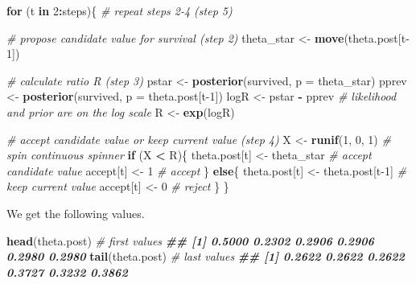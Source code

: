 \documentclass[
  12pt,
]{krantz}
\newenvironment{Shaded}{\begin{snugshade}}{\end{snugshade}}
\newcommand{\AttributeTok}[1]{\textcolor[rgb]{0.13,0.29,0.53}{#1}}
\newcommand{\CommentTok}[1]{\textcolor[rgb]{0.56,0.35,0.01}{\textit{#1}}}
\newcommand{\ControlFlowTok}[1]{\textcolor[rgb]{0.13,0.29,0.53}{\textbf{#1}}}
\newcommand{\DecValTok}[1]{\textcolor[rgb]{0.00,0.00,0.81}{#1}}
\newcommand{\DocumentationTok}[1]{\textcolor[rgb]{0.56,0.35,0.01}{\textbf{\textit{#1}}}}
\newcommand{\FunctionTok}[1]{\textcolor[rgb]{0.13,0.29,0.53}{\textbf{#1}}}
\newcommand{\NormalTok}[1]{#1}
\newcommand{\OtherTok}[1]{\textcolor[rgb]{0.56,0.35,0.01}{#1}}
\newcommand{\SpecialCharTok}[1]{\textcolor[rgb]{0.81,0.36,0.00}{\textbf{#1}}}
\begin{document}
\begin{Shaded}
\begin{Highlighting}[]
\ControlFlowTok{for}\NormalTok{ (t }\ControlFlowTok{in} \DecValTok{2}\SpecialCharTok{:}\NormalTok{steps)\{ }\CommentTok{\# repeat steps 2{-}4 (step 5)}
  
  \CommentTok{\# propose candidate value for survival (step 2)}
\NormalTok{  theta\_star }\OtherTok{\textless{}{-}} \FunctionTok{move}\NormalTok{(theta.post[t}\DecValTok{{-}1}\NormalTok{])}
  
  \CommentTok{\# calculate ratio R (step 3)}
\NormalTok{  pstar }\OtherTok{\textless{}{-}} \FunctionTok{posterior}\NormalTok{(survived, }\AttributeTok{p =}\NormalTok{ theta\_star)  }
\NormalTok{  pprev }\OtherTok{\textless{}{-}} \FunctionTok{posterior}\NormalTok{(survived, }\AttributeTok{p =}\NormalTok{ theta.post[t}\DecValTok{{-}1}\NormalTok{])}
\NormalTok{  logR }\OtherTok{\textless{}{-}}\NormalTok{ pstar }\SpecialCharTok{{-}}\NormalTok{ pprev }\CommentTok{\# likelihood and prior are on the log scale}
\NormalTok{  R }\OtherTok{\textless{}{-}} \FunctionTok{exp}\NormalTok{(logR)}
  
  \CommentTok{\# accept candidate value or keep current value (step 4)}
\NormalTok{  X }\OtherTok{\textless{}{-}} \FunctionTok{runif}\NormalTok{(}\DecValTok{1}\NormalTok{, }\DecValTok{0}\NormalTok{, }\DecValTok{1}\NormalTok{) }\CommentTok{\# spin continuous spinner}
  \ControlFlowTok{if}\NormalTok{ (X }\SpecialCharTok{\textless{}}\NormalTok{ R)\{}
\NormalTok{    theta.post[t] }\OtherTok{\textless{}{-}}\NormalTok{ theta\_star }\CommentTok{\# accept candidate value}
\NormalTok{    accept[t] }\OtherTok{\textless{}{-}} \DecValTok{1} \CommentTok{\# accept}
\NormalTok{  \}}
  \ControlFlowTok{else}\NormalTok{\{}
\NormalTok{    theta.post[t] }\OtherTok{\textless{}{-}}\NormalTok{ theta.post[t}\DecValTok{{-}1}\NormalTok{] }\CommentTok{\# keep current value}
\NormalTok{    accept[t] }\OtherTok{\textless{}{-}} \DecValTok{0} \CommentTok{\# reject}
\NormalTok{  \}}
\NormalTok{\}}
\end{Highlighting}
\end{Shaded}

We get the following values.

\begin{Shaded}
\begin{Highlighting}[]
\FunctionTok{head}\NormalTok{(theta.post) }\CommentTok{\# first values}
\DocumentationTok{\#\# [1] 0.5000 0.2302 0.2906 0.2906 0.2980 0.2980}
\FunctionTok{tail}\NormalTok{(theta.post) }\CommentTok{\# last values}
\DocumentationTok{\#\# [1] 0.2622 0.2622 0.2622 0.3727 0.3232 0.3862}
\end{Highlighting}
\end{Shaded}
\end{document}
